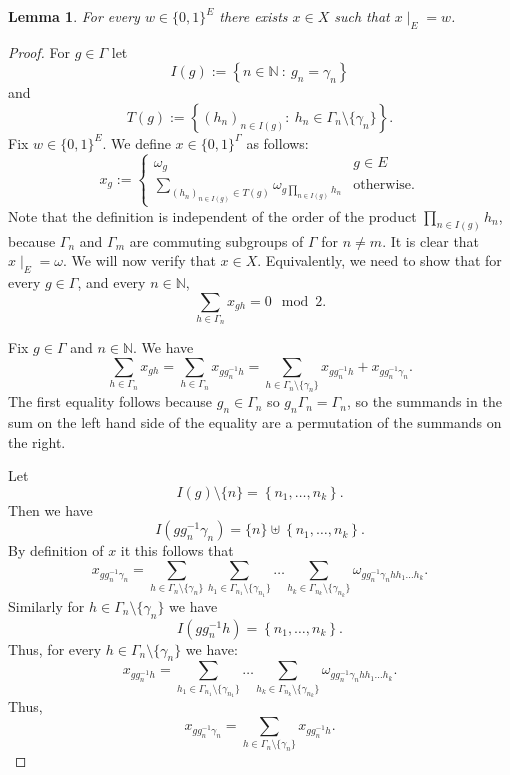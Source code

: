 \documentclass[oneside,english]{amsart}
\newtheorem{lem}[thm]{Lemma}
\theoremstyle{definition}
\begin{document}
\begin{lem}\label{lem:X_E_ext}
For every $w \in \{0,1\}^E$ there exists $x \in X$ such that $x\mid_E = w$.
\end{lem}
\begin{proof}
For $g \in \Gamma$ let
\begin{equation}
I(g) :=  \left\{ n\in \mathbb{N}~:~ g_n =\gamma_n\right\}
\end{equation}
and
\begin{equation}
T(g):= \left\{ (h_n)_{n \in I(g)}:~ h_n \in \Gamma_{n} \setminus \{\gamma_n\}\right\}.
\end{equation}
Fix $w \in \{0,1\}^E$. We define $x \in \{0,1\}^\Gamma$  as follows:
\begin{equation}
x_g := \begin{cases}
\omega_g & g \in E\\
\sum_{(h_n)_{n \in I(g)} \in T(g)}\omega_{g\prod_{n \in I(g)}h_n} & \mbox{otherwise}.
\end{cases}
\end{equation}
Note that the definition is independent of the order of the product $\prod_{n \in I(g)}h_n$, because $\Gamma_n$ and  $\Gamma_m$ are commuting subgroups of $\Gamma$ for $n \ne m$.
It is clear that $x\mid_E = \omega$.
We will now verify that $x \in X$. Equivalently, we need to show that for every $g \in \Gamma$, and every $n \in \mathbb{N}$,
\begin{equation}\label{eq:sum_x_g}
\sum_{h \in \Gamma_n} x_{gh} = 0 \mod 2.
\end{equation}

Fix $g \in \Gamma$ and $n \in \mathbb{N}$.
We have
$$\sum_{h \in \Gamma_n} x_{gh} = \sum_{h \in \Gamma_n} x_{gg_n^{-1}h} =
 \sum_{h \in  \Gamma_n \setminus  \{\gamma_n\}} x_{gg_n^{-1}h} +  x_{g g_n^{-1} \gamma_n}.$$
The first equality follows because $g_n \in \Gamma_n$ so $g_n\Gamma_n= \Gamma_n$,  so the summands in the sum on the left hand side of the equality are a permutation of the summands on the right.

Let
$$I(g)\setminus \{n\} = \left\{n_1,\ldots,n_k \right\}.$$
Then we have
$$I(g g_n^{-1}\gamma_n) = \{n\} \uplus \left\{n_1,\ldots,n_k \right\}.$$
By definition of $x$ it this follows that
$$ x_{g g_n^{-1} \gamma_n} = \sum_{h \in \Gamma_n \setminus \{\gamma_n\}} \sum_{h_1 \in \Gamma_{n_1}\setminus \{\gamma_{n_1}\}}\ldots\sum_{h_k \in \Gamma_{n_k}\setminus \{\gamma_{n_k}\}} \omega_{gg_n^{-1}\gamma_n h h_1\ldots h_k}.$$
Similarly for $h \in \Gamma_n \setminus  \{\gamma_n\}$ we have
$$I(gg_n^{-1}h) = \left\{n_1,\ldots,n_k \right\}.$$ Thus, for every $h \in \Gamma_n \setminus  \{\gamma_n\}$ we have:
$$  x_{gg_n^{-1}h} = \sum_{h_1 \in \Gamma_{n_1}\setminus \{\gamma_{n_1}\}}\ldots\sum_{h_k \in \Gamma_{n_k}\setminus \{\gamma_{n_k}\}} \omega_{gg_n^{-1}\gamma_n h h_1\ldots h_k}.$$
Thus,
$$ x_{g g_n^{-1} \gamma_n}=  \sum_{h \in  \Gamma_n \setminus  \{\gamma_n\}} x_{gg_n^{-1}h}.$$


\end{proof}
\end{document}
